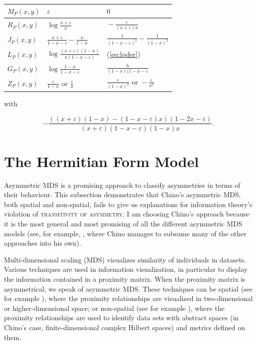 \documentclass[phd,12pt,oneside]{ubcthesis}
\begin{document}
\begin{tabular}{|l|l|l|}\hline
  $M_{P}(x,y)$ & $\displaystyle{}\varepsilon$ & $0$ \\ \hline
  $R_{P}(x,y)$ & $\displaystyle{}\log\frac{x+\varepsilon}{x}$ & $\displaystyle{}-\frac{\varepsilon}{(x+\varepsilon)x}$ \\ \hline
  $J_{P}(x,y)$ & $\displaystyle{}\frac{x+\varepsilon}{1-x-\varepsilon}-\frac{x}{1-x}$ & $\displaystyle{}\frac{1}{(1-x-\varepsilon)^{2}}-\frac{1}{(1-x)^{2}}$ \\ \hline
  $L_{P}(x,y)$ & $\displaystyle{}\log\frac{(x+\varepsilon)(1-x)}{x(1-x-\varepsilon)}$ & (\ref{eq:lpder}) \\ \hline
  $G_{P}(x,y)$ & $\displaystyle{}\log\frac{1-x}{1-x-\varepsilon}$ & $\displaystyle{}\frac{h}{(1-x)(1-x-\varepsilon}$ \\ \hline
  $Z_{P}(x,y)$ & $\displaystyle{}\frac{\varepsilon}{1-x}\mbox{ or }\frac{\varepsilon}{x}$ & $\displaystyle{}\frac{\varepsilon}{(1-x)^{2}}\mbox{ or }-\frac{\varepsilon}{x^{2}}$ \\ \hline
\end{tabular}

with

\begin{equation}
  \label{eq:lpder}
  -\frac{{\left({\left(x + \varepsilon\right)} {\left(1 - x\right)} - {\left(1 - x - \varepsilon\right)} x\right)} {\left(1-2x-\varepsilon\right)}}{{\left(x + \varepsilon\right)} {\left(1-x-\varepsilon\right)} {\left(1-x\right)} x}.
\end{equation}

\chapter{The Hermitian Form Model}
\label{app:eekiquom}

Asymmetric MDS is a promising approach to classify asymmetries in
terms of their behaviour. This subsection demonstrates that Chino's
asymmetric MDS, both spatial and non-spatial, fails to give us
explanations for information theory's violation of
\textsc{transitivity of asymmetry}. I am choosing Chino's approach
because it is the most general and most promising of all the different
asymmetric MDS models (see, for example, ,
where Chino manages to subsume many of the other approaches into his
own).

Multi-dimensional scaling (MDS) visualizes similarity of individuals
in data\-sets. Various techniques are used in information visualization,
in particular to display the information contained in a proximity
matrix. When the proximity matrix is asymmetrical, we speak of
asymmetric MDS. These techniques can be spatial (see for example
), where the proximity relationships are
visualized in two-dimensional or higher-dimensional space; or
non-spatial (see for example ), where the
proximity relationships are used to identify data sets with abstract
spaces (in Chino's case, finite-dimensional complex Hilbert spaces)
and metrics defined on them.
\end{document}
